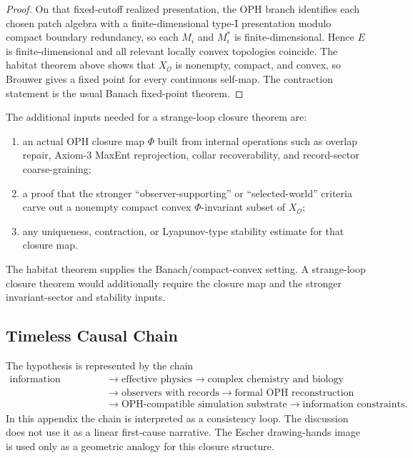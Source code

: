\begin{proof}
On that fixed-cutoff realized presentation, the OPH branch identifies each chosen patch algebra
with a finite-dimensional type-I presentation modulo compact boundary redundancy, so each \(M_i\)
and \(M_i^*\) is finite-dimensional. Hence \(E\) is finite-dimensional and all relevant locally
convex topologies coincide. The habitat theorem above shows that \(X_{\mathcal O}\) is nonempty,
compact, and convex, so Brouwer gives a fixed point for every continuous self-map. The
contraction statement is the usual Banach fixed-point theorem.
\end{proof}

The additional inputs needed for a strange-loop closure theorem are:
\begin{enumerate}
\item an actual OPH closure map \(\Phi\) built from internal operations such as overlap repair,
Axiom-3 MaxEnt reprojection, collar recoverability, and record-sector coarse-graining;
\item a proof that the stronger ``observer-supporting'' or ``selected-world'' criteria carve out a
nonempty compact convex \(\Phi\)-invariant subset of \(X_{\mathcal O}\);
\item any uniqueness, contraction, or Lyapunov-type stability estimate for that closure map.
\end{enumerate}

The habitat theorem supplies the Banach/compact-convex setting. A strange-loop closure theorem
would additionally require the closure map and the stronger invariant-sector and stability
inputs.

\subsection{Timeless Causal Chain}

The hypothesis is represented by the chain
\[
\begin{aligned}
\text{information constraints}
&\to \text{effective physics}
\to \text{complex chemistry and biology}\\
&\to \text{observers with records}
\to \text{formal OPH reconstruction}\\
&\to \text{OPH-compatible simulation substrate}
\to \text{information constraints}.
\end{aligned}
\]
In this appendix the chain is interpreted as a consistency loop. The discussion does not use it as
a linear first-cause narrative. The Escher drawing-hands image is used only as a geometric
analogy for this closure structure.

